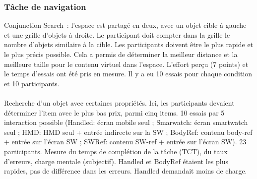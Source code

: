 \subsubsection*{Tâche de navigation}
Conjunction Search~: l'espace est partagé en deux, avec un objet cible à gauche et une grille d'objets à droite. Le participant doit compter dans la grille le nombre d'objets similaire à la cible. Les participants doivent être le plus rapide et le plus précis possible. Cela a permis de déterminer la meilleur distance et la meilleure taille pour le contenu virtuel dans l'espace. L'effort perçu (7 points) et le temps d'essais ont été pris en mesure. Il y a eu 10 essais pour chaque condition et 10 participants. \cite{EnsFinneganIrani2014} \\
\cite{RashidNacentaQuigley2012} \\
Recherche d'un objet avec certaines propriétés. Ici, les participants devaient déterminer l'item avec le plus bas prix, parmi cinq items. 10 essais par 5 interaction possible (Handled: écran mobile seul ; Smarwatch: écran smartwatch seul ; HMD: HMD seul + entrée indirecte sur la SW ; BodyRef: contenu body-ref + entrée sur l'écran SW ; SWRef: contenu SW-ref + entrée sur l'écran SW). 23 participants. Mesure du temps de complétion de la tâche (TCT), du taux d'erreurs, charge mentale (subjectif). Handled et BodyRef étaient les plus rapides, pas de différence dans les erreurs. Handled demandait moins de charge. \cite{GrubertHeinischQuigleyEtAl2015}

